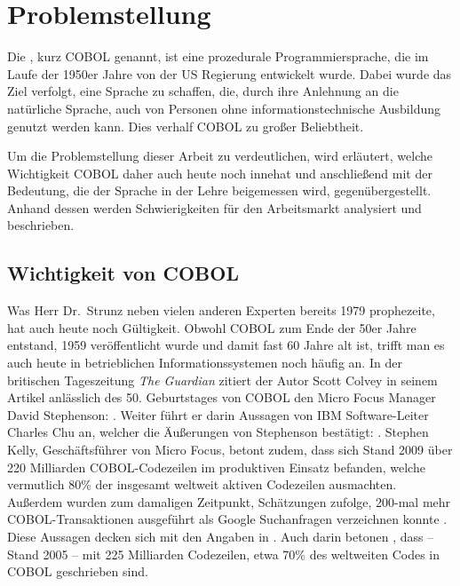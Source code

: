 \section{Problemstellung}\label{problemstellung}
Die , kurz COBOL genannt, ist eine prozedurale Programmiersprache, die im Laufe der 1950er Jahre von der US Regierung entwickelt wurde. Dabei wurde das Ziel verfolgt, eine Sprache zu schaffen, die, durch ihre Anlehnung an die natürliche Sprache, auch von Personen ohne informationstechnische Ausbildung genutzt werden kann. Dies verhalf COBOL zu großer Beliebtheit.

Um die Problemstellung dieser Arbeit zu verdeutlichen, wird erläutert, welche Wichtigkeit COBOL daher auch heute noch innehat und anschließend mit der Bedeutung, die der Sprache in der Lehre beigemessen wird, gegenübergestellt. Anhand dessen werden Schwierigkeiten für den Arbeitsmarkt analysiert und beschrieben.

\subsection*{Wichtigkeit von COBOL}\label{wichtigkeit}
 \cite{_ist_1979}

Was Herr Dr.\  Strunz neben vielen anderen Experten bereits 1979 prophezeite, hat auch heute noch Gültigkeit. Obwohl COBOL zum Ende der 50er Jahre entstand, 1959 veröffentlicht wurde und damit fast 60 Jahre alt ist, trifft man es auch heute in betrieblichen Informationssystemen noch häufig an. In der britischen Tageszeitung \textit{The Guardian} zitiert der Autor Scott Colvey in seinem Artikel \cite{colvey_cobol_2009} anlässlich des 50. Geburtstages von COBOL den Micro Focus Manager David Stephenson: . Weiter führt er darin Aussagen von IBM Software-Leiter Charles Chu an, welcher die Äußerungen von Stephenson bestätigt: . Stephen Kelly, Geschäftsführer von Micro Focus, betont zudem, dass sich Stand 2009 über 220 Milliarden COBOL-Codezeilen im produktiven Einsatz befanden, welche vermutlich 80\% der insgesamt weltweit aktiven Codezeilen ausmachten. Außerdem wurden zum damaligen Zeitpunkt, Schätzungen zufolge, 200-mal mehr COBOL-Transaktionen ausgeführt als Google Suchanfragen verzeichnen konnte \cite{kelly_cobol_2009}. Diese Aussagen decken sich mit den Angaben in . Auch darin betonen \citeauthor{doke_cobol_2005}, dass -- Stand 2005 -- mit 225 Milliarden Codezeilen, etwa 70\% des weltweiten Codes in COBOL geschrieben sind.


